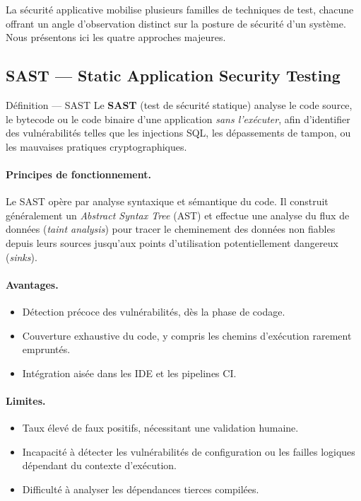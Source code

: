 La sécurité applicative mobilise plusieurs familles de techniques de test,
chacune offrant un angle d'observation distinct sur la posture de sécurité
d'un système. Nous présentons ici les quatre approches majeures.

\subsection{SAST --- Static Application Security Testing}

\begin{definitionbox}{Définition --- SAST}
  Le \textbf{SAST} (test de sécurité statique) analyse le code source, le bytecode
  ou le code binaire d'une application \textit{sans l'exécuter}, afin d'identifier
  des vulnérabilités telles que les injections SQL, les dépassements de tampon,
  ou les mauvaises pratiques cryptographiques.
\end{definitionbox}

\paragraph{Principes de fonctionnement.}
Le SAST opère par analyse syntaxique et sémantique du code. Il construit
généralement un \textit{Abstract Syntax Tree} (AST) et effectue une analyse
du flux de données (\textit{taint analysis}) pour tracer le cheminement des
données non fiables depuis leurs sources jusqu'aux points d'utilisation
potentiellement dangereux (\textit{sinks}).

\paragraph{Avantages.}
\begin{itemize}
  \item Détection précoce des vulnérabilités, dès la phase de codage.
  \item Couverture exhaustive du code, y compris les chemins d'exécution rarement
    empruntés.
  \item Intégration aisée dans les IDE et les pipelines CI.
\end{itemize}

\paragraph{Limites.}
\begin{itemize}
  \item Taux élevé de faux positifs, nécessitant une validation humaine.
  \item Incapacité à détecter les vulnérabilités de configuration ou
    les failles logiques dépendant du contexte d'exécution.
  \item Difficulté à analyser les dépendances tierces compilées.
\end{itemize}

